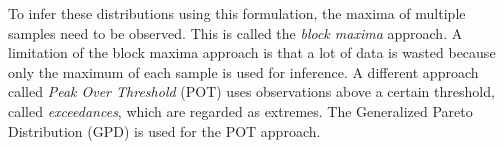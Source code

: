


To infer these distributions using this formulation, the maxima of multiple samples need to be observed. This is called the  \textit{block maxima} approach. A limitation of the block maxima approach is that a lot of data is wasted because only the maximum of each sample is used for inference. A different approach called \textit{Peak Over Threshold} (POT) uses observations above a certain threshold, called \textit{exceedances}, which are regarded as extremes. The Generalized Pareto Distribution (GPD) is used for the POT approach. 

